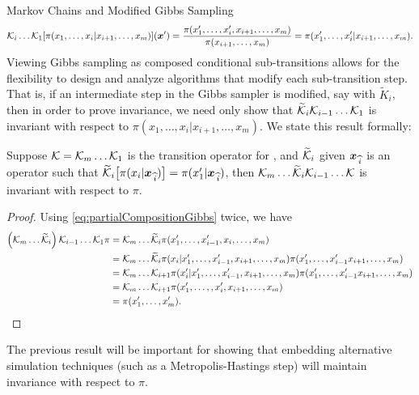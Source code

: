 \begin{chapter}{Markov Chains and Modified Gibbs Sampling}
\begin{equation}
  \mathcal K_i\dots \mathcal K_1 [\pi(x_1,\dots,x_i|x_{i+1},\dots,x_m)](\mbox{\boldmath$x$}') 
  = \frac{\pi(x_1',\dots,x_i',x_{i+1},\dots ,x_m)}{\pi(x_{i+1},\dots,x_m)} = \pi(x_1',\dots,x_i'|x_{i+1},\dots,x_m).
\end{equation}
Viewing Gibbs sampling as composed conditional sub-transitions allows for the flexibility to design and analyze algorithms that modify each sub-transition step. 
That is, if an intermediate step in the Gibbs sampler is modified, say with $\tilde K_i$, then in order to prove invariance, we need only show that $\widetilde {\mathcal K}_i\mathcal K_{i-1}\dots\mathcal K_1$ is invariant with respect to $\pi(x_1,\dots,x_i|x_{i+1},\dots,x_m)$.
We state this result formally:
\begin{cor} \label{cor:conditionalTransition}
  Suppose $\mathcal K = \mathcal K_m\dots\mathcal K_1$ is the transition operator for , and $\widetilde {\mathcal K}_i$ given $\mbox{\boldmath$x$}_{\,\widehat{i}}$ is an operator such that $\widetilde {\mathcal K}_i \big[\pi(x_i|\mbox{\boldmath$x$}_{\,\widehat{i}})\big] = \pi(x_1'|\mbox{\boldmath$x$}_{\,\widehat{i}})$, then $\mathcal K_m\dots\widetilde {\mathcal K}_i\mathcal K_{i-1}\dots\mathcal K$ is invariant with respect to $\pi$.
\end{cor}
\begin{proof} 
  Using \eqref{eq:partialCompositionGibbs} twice, we have 
  \begin{align}
    \left(\mathcal K_m\dots\widetilde {\mathcal K}_i\right)\mathcal K_{i-1}\dots\mathcal K_1 \pi 
      &= \mathcal K_m\dots \widetilde {\mathcal K}_i \pi(x_1',\dots,x_{i-1}',x_i,\dots,x_m) \nonumber\\
      &= \mathcal K_m\dots \widetilde {\mathcal K}_i \pi(x_i|x_1',\dots,x_{i-1}',x_{i+1},\dots,x_m)\pi(x_1',\dots,x_{i-1}'x_{i+1},\dots,x_m) \nonumber\\
      &= \mathcal K_m\dots \mathcal K_{i+1}\pi(x_i'|x_1',\dots,x_{i-1}',x_{i+1},\dots,x_m)\pi(x_1',\dots,x_{i-1}'x_{i+1},\dots,x_m) \nonumber\\
      &= \mathcal K_m\dots \mathcal K_{i+1}\pi(x_1',\dots,,x_i',x_{i+1},\dots,x_m) \nonumber\\
      &= \pi(x_1',\dots,x_m').
  \end{align}
\end{proof}
The previous result will be important for showing that embedding alternative simulation techniques (such as a Metropolis-Hastings step) will maintain invariance with respect to $\pi$.


\end{chapter}

